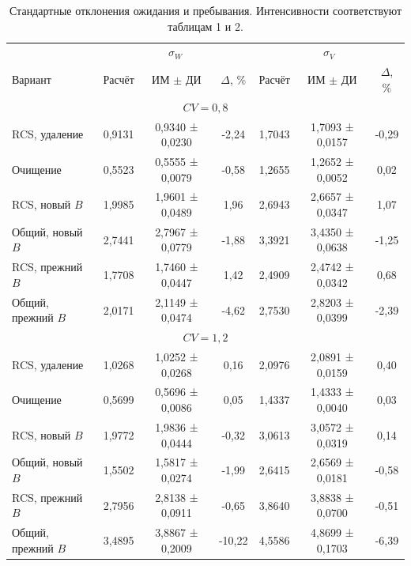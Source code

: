 \begin{table}[!htbp]
\centering\small\setlength{\tabcolsep}{3pt}
\begin{tabular}{@{}lcccccc@{}}
\toprule
 & \multicolumn{3}{c}{$\sigma_W$} & \multicolumn{3}{c}{$\sigma_V$} \\
Вариант & Расчёт & ИМ $\pm$ ДИ & $\Delta$, \% & Расчёт & ИМ $\pm$ ДИ & $\Delta$, \% \\
\midrule
\multicolumn{7}{c}{$CV=0,8$} \\
RCS, удаление & 0,9131 & 0,9340 ± 0,0230 & -2,24 & 1,7043 & 1,7093 ± 0,0157 & -0,29 \\
Очищение & 0,5523 & 0,5555 ± 0,0079 & -0,58 & 1,2655 & 1,2652 ± 0,0052 & 0,02 \\
RCS, новый $B$ & 1,9985 & 1,9601 ± 0,0489 & 1,96 & 2,6943 & 2,6657 ± 0,0347 & 1,07 \\
Общий, новый $B$ & 2,7441 & 2,7967 ± 0,0779 & -1,88 & 3,3921 & 3,4350 ± 0,0638 & -1,25 \\
RCS, прежний $B$ & 1,7708 & 1,7460 ± 0,0447 & 1,42 & 2,4909 & 2,4742 ± 0,0342 & 0,68 \\
Общий, прежний $B$ & 2,0171 & 2,1149 ± 0,0474 & -4,62 & 2,7530 & 2,8203 ± 0,0399 & -2,39 \\
\multicolumn{7}{c}{$CV=1,2$} \\
RCS, удаление & 1,0268 & 1,0252 ± 0,0268 & 0,16 & 2,0976 & 2,0891 ± 0,0159 & 0,40 \\
Очищение & 0,5699 & 0,5696 ± 0,0086 & 0,05 & 1,4337 & 1,4333 ± 0,0040 & 0,03 \\
RCS, новый $B$ & 1,9772 & 1,9836 ± 0,0444 & -0,32 & 3,0613 & 3,0572 ± 0,0319 & 0,14 \\
Общий, новый $B$ & 1,5502 & 1,5817 ± 0,0274 & -1,99 & 2,6415 & 2,6569 ± 0,0181 & -0,58 \\
RCS, прежний $B$ & 2,7956 & 2,8138 ± 0,0911 & -0,65 & 3,8640 & 3,8838 ± 0,0700 & -0,51 \\
Общий, прежний $B$ & 3,4895 & 3,8867 ± 0,2009 & -10,22 & 4,5586 & 4,8699 ± 0,1703 & -6,39 \\
\bottomrule
\end{tabular}
\caption{Стандартные отклонения ожидания и пребывания. Интенсивности соответствуют таблицам 1 и 2.}
\label{tab:sko}
\end{table}
